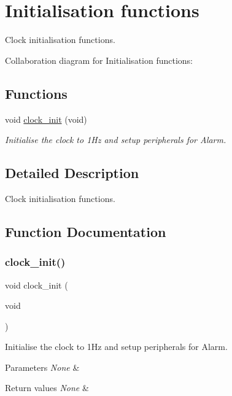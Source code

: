 \hypertarget{group___clock___init}{}\section{Initialisation functions}
\label{group___clock___init}


Clock initialisation functions.  


Collaboration diagram for Initialisation functions\+:
\subsection*{Functions}
\begin{DoxyCompactItemize}
\item 
void \hyperlink{group___clock___init_ga78ab77b57cf2e00089f0a3a22508524c}{clock\+\_\+init} (void)
\begin{DoxyCompactList}\small\item\em Initialise the clock to 1\+Hz and setup peripherals for Alarm. \end{DoxyCompactList}\end{DoxyCompactItemize}


\subsection{Detailed Description}
Clock initialisation functions. 



\subsection{Function Documentation}
\mbox{\label{group___clock___init_ga78ab77b57cf2e00089f0a3a22508524c}} 
\subsubsection{\texorpdfstring{clock\+\_\+init()}{clock\_init()}}
{\footnotesize\ttfamily void clock\+\_\+init (\begin{DoxyParamCaption}\item[{void}]{ }\end{DoxyParamCaption})}



Initialise the clock to 1\+Hz and setup peripherals for Alarm. 


\begin{DoxyParams}{Parameters}
{\em None} & \\
\hline
\end{DoxyParams}

\begin{DoxyRetVals}{Return values}
{\em None} & \\
\hline
\end{DoxyRetVals}
